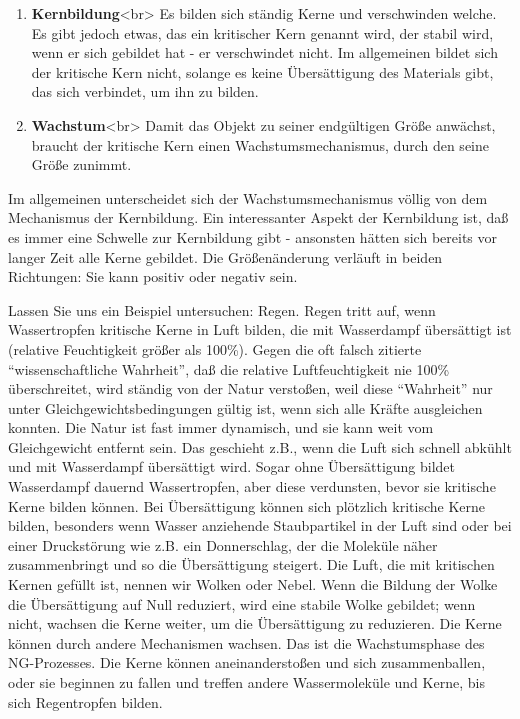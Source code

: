 \begin{enumerate}[label={\arabic*.}] 
\item \textbf{Kernbildung}<br>
Es bilden sich ständig Kerne und verschwinden welche.
Es gibt jedoch etwas, das ein kritischer Kern genannt wird, der stabil wird, wenn er sich gebildet hat - er verschwindet nicht.
Im allgemeinen bildet sich der kritische Kern nicht, solange es keine Übersättigung des Materials gibt, das sich verbindet, um ihn zu bilden.

\item \textbf{Wachstum}<br>
Damit das Objekt zu seiner endgültigen Größe anwächst, braucht der kritische Kern einen Wachstumsmechanismus, durch den seine Größe zunimmt.


 \end{enumerate}
Im allgemeinen unterscheidet sich der Wachstumsmechanismus völlig von dem Mechanismus der Kernbildung.
Ein interessanter Aspekt der Kernbildung ist, daß es immer eine Schwelle zur Kernbildung gibt - ansonsten hätten sich bereits vor langer Zeit alle Kerne gebildet.
Die Größenänderung verläuft in beiden Richtungen: Sie kann positiv oder negativ sein.

Lassen Sie uns ein Beispiel untersuchen: Regen.
Regen tritt auf, wenn Wassertropfen kritische Kerne in Luft bilden, die mit Wasserdampf übersättigt ist (relative Feuchtigkeit größer als 100\%).
Gegen die oft falsch zitierte \enquote{wissenschaftliche Wahrheit}, daß die relative Luftfeuchtigkeit nie 100\% überschreitet, wird ständig von der Natur verstoßen, weil diese \enquote{Wahrheit} nur unter Gleichgewichtsbedingungen gültig ist, wenn sich alle Kräfte ausgleichen konnten.
Die Natur ist fast immer dynamisch, und sie kann weit vom Gleichgewicht entfernt sein.
Das geschieht z.B., wenn die Luft sich schnell abkühlt und mit Wasserdampf übersättigt wird.
Sogar ohne Übersättigung bildet Wasserdampf dauernd Wassertropfen, aber diese verdunsten, bevor sie kritische Kerne bilden können.
Bei Übersättigung können sich plötzlich kritische Kerne bilden, besonders wenn Wasser anziehende Staubpartikel in der Luft sind oder bei einer Druckstörung wie z.B. ein Donnerschlag, der die Moleküle näher zusammenbringt und so die Übersättigung steigert.
Die Luft, die mit kritischen Kernen gefüllt ist, nennen wir Wolken oder Nebel.
Wenn die Bildung der Wolke die Übersättigung auf Null reduziert, wird eine stabile Wolke gebildet; wenn nicht, wachsen die Kerne weiter, um die Übersättigung zu reduzieren.
Die Kerne können durch andere Mechanismen wachsen.
Das ist die Wachstumsphase des NG-Prozesses.
Die Kerne können aneinanderstoßen und sich zusammenballen, oder sie beginnen zu fallen und treffen andere Wassermoleküle und Kerne, bis sich Regentropfen bilden.

